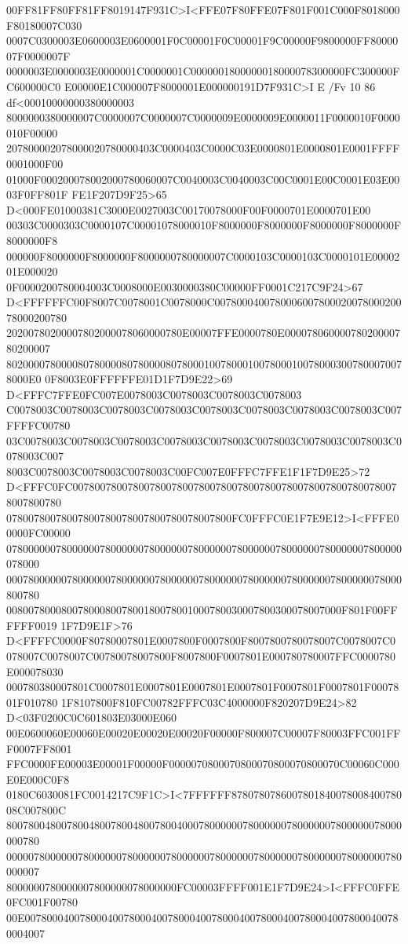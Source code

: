 00FF81FF80FF81FF8019147F931C>I<FFE07F80FFE07F801F001C000F8018000F80180007C030
0007C0300003E0600003E0600001F0C00001F0C00001F9C00000F9800000FF8000007F0000007F
0000003E0000003E0000001C0000001C0000001800000018000078300000FC300000FC600000C0
E00000E1C000007F8000001E000000191D7F931C>I E /Fv 10 86 df<00010000000380000003
8000000380000007C0000007C0000007C0000009E0000009E0000011F0000010F0000010F00000
207800002078000020780000403C0000403C0000C03E0000801E0000801E0001FFFF0001000F00
01000F000200078002000780060007C0040003C0040003C00C0001E00C0001E03E0003F0FF801F
FE1F207D9F25>65 D<000FE01000381C3000E0027003C00170078000F00F0000701E0000701E00
00303C0000303C0000107C00001078000010F8000000F8000000F8000000F8000000F8000000F8
000000F8000000F8000000F8000000780000007C0000103C0000103C0000101E0000201E000020
0F0000200780004003C0008000E0030000380C00000FF0001C217C9F24>67
D<FFFFFFC00F8007C0078001C0078000C007800040078000600780002007800020078000200780
20200780200007802000078060000780E00007FFE0000780E00007806000078020000780200007
8020000780000807800008078000080780001007800010078000100780003007800070078000E0
0F8003E0FFFFFFE01D1F7D9E22>69 D<FFFC7FFE0FC007E0078003C0078003C0078003C0078003
C0078003C0078003C0078003C0078003C0078003C0078003C0078003C0078003C007FFFFC00780
03C0078003C0078003C0078003C0078003C0078003C0078003C0078003C0078003C0078003C007
8003C0078003C0078003C0078003C00FC007E0FFFC7FFE1F1F7D9E25>72
D<FFFC0FC007800780078007800780078007800780078007800780078007800780078007800780
07800780078007800780078007800780078007800FC0FFFC0E1F7E9E12>I<FFFE00000FC00000
078000000780000007800000078000000780000007800000078000000780000007800000078000
000780000007800000078000000780000007800000078000000780000007800000078000800780
0080078000800780008007800180078001000780030007800300078007000F801F00FFFFFF0019
1F7D9E1F>76 D<FFFFC0000F80780007801E0007800F0007800F8007800780078007C0078007C0
078007C0078007C00780078007800F8007800F0007801E000780780007FFC0000780E000078030
000780380007801C0007801E0007801E0007801E0007801F0007801F0007801F0007801F010780
1F8107800F810FC00782FFFC03C4000000F820207D9E24>82 D<03F0200C0C601803E03000E060
00E0600060E00060E00020E00020E00020F00000F800007C00007F80003FFC001FFF0007FF8001
FFC0000FE00003E00001F00000F0000070800070800070800070800070C00060C000E0E000C0F8
0180C6030081FC0014217C9F1C>I<7FFFFFF878078078600780184007800840078008C007800C
800780048007800480078004800780040007800000078000000780000007800000078000000780
000007800000078000000780000007800000078000000780000007800000078000000780000007
8000000780000007800000078000000FC00003FFFF001E1F7D9E24>I<FFFC0FFE0FC001F00780
00E007800040078000400780004007800040078000400780004007800040078000400780004007
